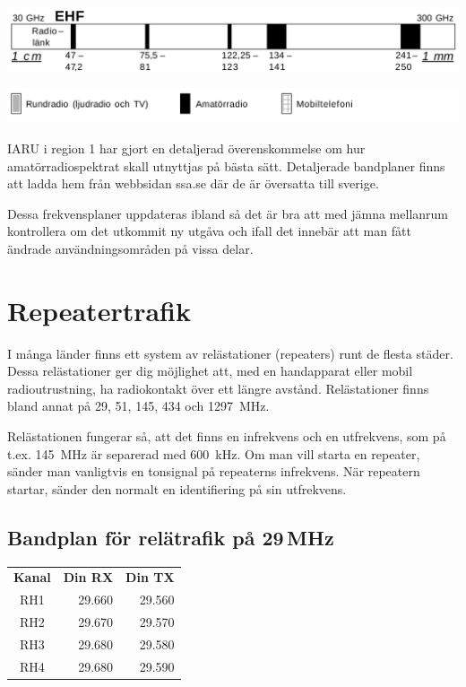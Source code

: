 \includegraphics[width=\columnwidth]{blabok/pictures/r6-8-ehf}

\includegraphics[width=\columnwidth]{blabok/pictures/r6-9}

IARU i region 1 har gjort en detaljerad överenskommelse om hur amatörradiospektrat skall utnyttjas på bästa sätt. Detaljerade bandplaner finns att ladda hem från webbsidan ssa.se där de är översatta till sverige.

Dessa frekvensplaner uppdateras ibland så det är bra att med jämna mellanrum kontrollera om det utkommit ny utgåva och ifall det innebär att man fått ändrade användningsområden på vissa delar.

\section{Repeatertrafik}
	
I många länder finns ett system av relästationer (repeaters) runt de flesta städer.
Dessa relästationer ger dig möjlighet att, med en handapparat eller mobil radioutrustning, ha radiokontakt över ett längre avstånd. Relästationer finns bland annat på 29, 51, 145, 434 och \SI{1297}{MHz}.

Relästationen fungerar så, att det finns en infrekvens och en utfrekvens, som på
t.ex. \SI{145}{MHz} är separerad med \SI{600}{kHz}. Om man vill starta en repeater, sänder man vanligtvis en tonsignal på repeaterns infrekvens. När repeatern startar, sänder den normalt en identifiering på sin utfrekvens. 

\subsection{Bandplan för relätrafik på 29\,MHz}

\begin{tabular}{crr}
	\textbf{Kanal} & \textbf{Din RX} & \textbf{Din TX} \\
	     RH1       &    \num{29,660} &    \num{29,560} \\
	     RH2       &    \num{29,670} &    \num{29,570} \\
	     RH3       &    \num{29,680} &    \num{29,580} \\
	     RH4       &    \num{29,680} &    \num{29,590}
\end{tabular}

